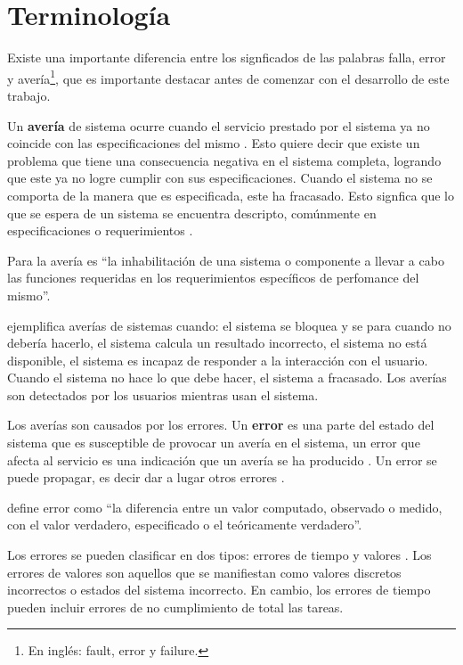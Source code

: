 \section{Terminología}\label{sec:terminologia}
Existe una importante diferencia entre los signficados de las palabras falla, error y 
avería\footnote{En inglés: fault, error y failure.}, que es importante destacar antes de comenzar 
con el desarrollo de este trabajo.

Un \textbf{avería} de sistema ocurre cuando el servicio prestado por el sistema ya no coincide con 
las especificaciones del mismo \citep{Hanmer07}. Esto quiere decir que existe un problema que tiene 
una consecuencia negativa en el sistema completa, logrando que este ya no logre cumplir con sus 
especificaciones. Cuando el sistema no se comporta de la manera que es especificada, este ha 
fracasado. Esto signfica que lo que se espera de un sistema se encuentra descripto, comúnmente en 
especificaciones o requerimientos \citep{Pullum01}.

Para la \cite{IEEE610.12} avería es ``la inhabilitación de una sistema o componente a llevar a 
cabo las funciones requeridas en los requerimientos específicos de perfomance del mismo''.

\cite{Hanmer07} ejemplifica averías de sistemas cuando: el sistema se bloquea y se para cuando no 
debería hacerlo, el sistema calcula un resultado incorrecto, el sistema no está disponible, el 
sistema es incapaz de responder a la interacción con el usuario. Cuando el sistema no hace lo que 
debe hacer, el sistema a fracasado. Los averías son detectados por los usuarios mientras usan el 
sistema.

Los averías son causados por los errores. Un \textbf{error} es una parte del estado del sistema 
que es susceptible de provocar un avería en el sistema, un error que afecta al servicio es una 
indicación que un avería se ha producido \citep{Hanmer07}. Un error se puede propagar, es decir 
dar a lugar otros errores \citep{Pullum01}.

\cite{IEEE610.12} define error como ``la diferencia entre un valor computado, observado o medido, 
con el valor verdadero, especificado o el teóricamente verdadero''.

Los errores se pueden clasificar en dos tipos: errores de tiempo y valores \citep{Hanmer07}. Los 
errores de valores son aquellos que se manifiestan como valores discretos incorrectos o estados del 
sistema incorrecto. En cambio, los errores de tiempo pueden incluir errores de no cumplimiento de 
total las tareas. 

